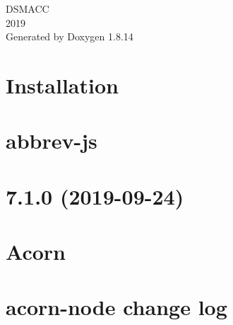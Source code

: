 \documentclass[twoside]{book}
\newcommand{\+}{\discretionary{\mbox{\scriptsize$\hookleftarrow$}}{}{}}
\newcommand{\clearemptydoublepage}{%
  \newpage{\pagestyle{empty}\cleardoublepage}%
}
\begin{document}
\hypersetup{pageanchor=false,
             bookmarksnumbered=true,
             pdfencoding=unicode
            }
\begin{titlepage}
\vspace*{7cm}
\begin{center}%
{\Large D\+S\+M\+A\+CC \\[1ex]\large 2019 }\\
\vspace*{1cm}
{\large Generated by Doxygen 1.8.14}\\
\end{center}
\end{titlepage}
\clearemptydoublepage
{}
\tableofcontents
\clearemptydoublepage
{}
\hypersetup{pageanchor=true}

\chapter{Installation}
\label{md_dsmacc_examples_DRmerge_node_modules__0Dtypes_node_README}

\chapter{abbrev-\/js}
\label{md_dsmacc_examples_DRmerge_node_modules_abbrev_README}

\chapter{7.1.0 (2019-\/09-\/24)}
\label{md_dsmacc_examples_DRmerge_node_modules_acorn_CHANGELOG}

\chapter{Acorn}
\label{md_dsmacc_examples_DRmerge_node_modules_acorn_README}

\chapter{acorn-\/node change log}
\label{md_dsmacc_examples_DRmerge_node_modules_acorn-node_CHANGELOG}

\end{document}
